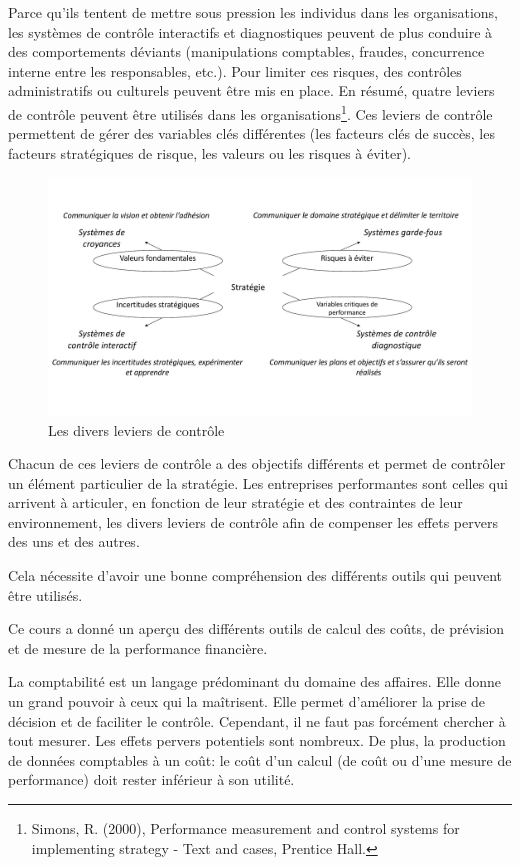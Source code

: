 \documentclass[oneside]{kaobook}
\begin{document}
Parce qu'ils tentent de mettre sous pression les individus dans les organisations, les systèmes de contrôle interactifs et diagnostiques peuvent de plus conduire à des comportements déviants (manipulations comptables, fraudes, concurrence interne entre les responsables, etc.). Pour limiter ces risques, des contrôles administratifs ou culturels peuvent être mis en place. En résumé, quatre leviers de contrôle peuvent être utilisés dans les organisations\footnote{Simons, R. (2000), Performance measurement and control systems for implementing strategy - Text and cases, Prentice Hall.}. Ces leviers de contrôle permettent de gérer des variables clés différentes (les facteurs clés de succès, les facteurs stratégiques de risque, les valeurs ou les risques à éviter). 

\begin{figure}[H]

\includegraphics{./img/levers.pdf}
\caption{Les divers leviers de contrôle}
\end{figure}

Chacun de ces leviers de contrôle a des objectifs différents et permet de contrôler un élément particulier de la stratégie. Les entreprises performantes sont celles qui arrivent à articuler, en fonction de leur stratégie et des contraintes de leur environnement, les divers leviers de contrôle afin de compenser les effets pervers des uns et des autres.

Cela nécessite d'avoir une bonne compréhension des différents outils qui peuvent être utilisés. 

\begin{kaobox}
Ce cours a donné un aperçu des différents outils de calcul des coûts, de prévision et de mesure de la performance financière. 

La comptabilité est un langage prédominant du domaine des affaires. Elle donne un grand pouvoir à ceux qui la maîtrisent. Elle permet d'améliorer la prise de décision et de faciliter le contrôle. Cependant, il ne faut pas forcément chercher à tout mesurer. Les effets pervers potentiels sont nombreux. De plus, la production de données comptables à un coût: le coût d’un calcul (de coût ou d'une mesure de performance) doit rester inférieur à son utilité.
\end{kaobox}
\end{document}
